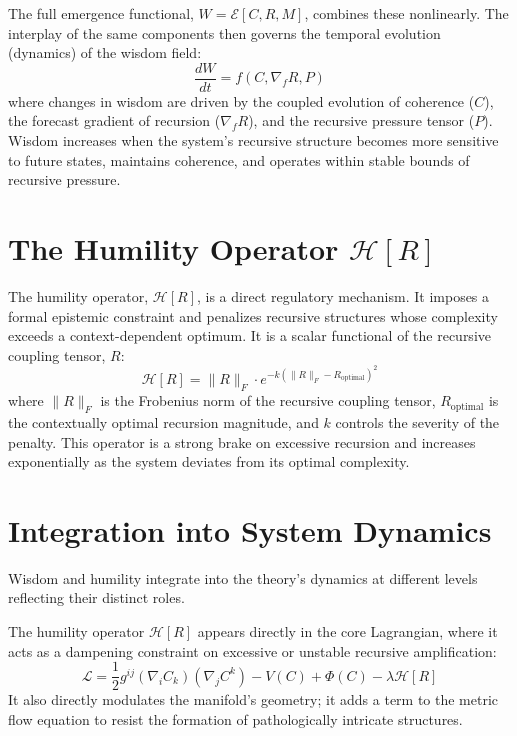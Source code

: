 The full emergence functional, \(W = \mathcal{E}[C, R, M]\), combines these nonlinearly. The interplay of the same components then governs the temporal evolution (dynamics) of the wisdom field:
\begin{equation}
\frac{dW}{dt} = f(C, \nabla_f R, P)
\end{equation}
where changes in wisdom are driven by the coupled evolution of coherence (\(C\)), the forecast gradient of recursion (\(\nabla_f R\)), and the recursive pressure tensor (\(P\)). Wisdom increases when the system's recursive structure becomes more sensitive to future states, maintains coherence, and operates within stable bounds of recursive pressure.

\section{The Humility Operator \(\mathcal{H}[R]\)}

The humility operator, \(\mathcal{H}[R]\), is a direct regulatory mechanism. It imposes a formal epistemic constraint and penalizes recursive structures whose complexity exceeds a context-dependent optimum. It is a scalar functional of the recursive coupling tensor, \(R\):
\begin{equation}
\mathcal{H}[R] = \|R\|_F \cdot e^{-k(\|R\|_F - R_{\text{optimal}})^2}
\end{equation}
where \(\|R\|_F\) is the Frobenius norm of the recursive coupling tensor, \(R_{\text{optimal}}\) is the contextually optimal recursion magnitude, and \(k\) controls the severity of the penalty. This operator is a strong brake on excessive recursion and increases exponentially as the system deviates from its optimal complexity.

\section{Integration into System Dynamics}

Wisdom and humility integrate into the theory's dynamics at different levels reflecting their distinct roles.

The humility operator \(\mathcal{H}[R]\) appears directly in the core Lagrangian, where it acts as a dampening constraint on excessive or unstable recursive amplification:
\begin{equation}
\mathcal{L} = \frac{1}{2} g^{ij} (\nabla_i C_k)(\nabla_j C^k) - V(C) + \Phi(C) - \lambda \mathcal{H}[R]
\end{equation}
It also directly modulates the manifold's geometry; it adds a term to the metric flow equation to resist the formation of pathologically intricate structures.

